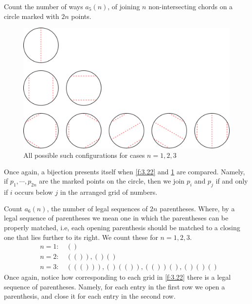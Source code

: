 \begin{question}
Count the number of ways $a_5(n)$, of joining $n$ non-intersecting chords on a circle marked with $2n$ points.     
\end{question}
\begin{solution}
\begin{figure}[H]
    \centering
    \includegraphics[width=0.8\linewidth]{Images/Figure14.png}
    \caption{All possible such configurations for cases $n=1,2,3$}
    \label{f:3.24}
\end{figure}
Once again, a bijection presents itself when \cref{f:3.22} and \cref{f:3.24} are compared. Namely, if $p_1,\cdots,p_{2n}$ are the marked points on the circle, then we join $p_i$ and $p_j$ if and only if $i$ occurs below $j$ in the arranged grid of numbers.     
\end{solution}
\begin{question}
Count $a_6(n)$, the number of legal sequences of $2n$ parentheses. Where, by a legal sequence of parentheses we mean one in which the parentheses can be properly matched, i.e, each opening parenthesis should be matched to a closing one that lies further to its right. We count these for $n=1,2,3$.
\begin{align*}
    & n=1: \quad \left(\right) \\
    & n=2: \quad \left(\left(\right)\right), \left(\right)\left(\right) \\
    & n=3: \quad \left(\left(\left(\right)\right)\right), \left(\right)\left(\left(\right)\right), \left(\left(\right)\right)\left(\right), \left(\right)\left(\right)\left(\right)
\end{align*}
Once again, notice how corresponding to each grid in \cref{f:3.22} there is a legal sequence of parentheses. Namely, for each entry in the first row we open a parenthesis, and close it for each entry in the second row.    
\end{question}
